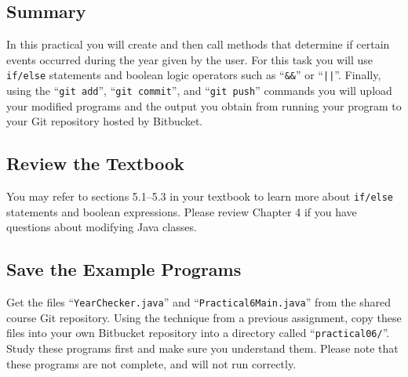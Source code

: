 




\subsection*{Summary}
\vspace*{-.05in}

In this practical you will create and then call methods that determine if certain events occurred during the year given
by the user. For this task you will use {\tt if/else} statements and boolean logic operators such as ``{\tt \&\&}'' or
``{\tt ||}''.  Finally, using the ``{\tt git add}'', ``{\tt git  commit}'', and ``{\tt git push}'' commands you will
upload your modified programs and the output you obtain from running your program to your Git repository hosted by
Bitbucket.  

\vspace*{-.1in}
\subsection*{Review the Textbook}
\vspace*{-.05in}

You may refer to sections 5.1--5.3 in your textbook to learn more about {\tt if/else} statements and boolean
expressions.  Please review Chapter 4 if you have questions about modifying Java classes.

\vspace*{-.1in}
\subsection*{Save the Example Programs}
\vspace*{-.05in}

Get the files ``{\tt YearChecker.java}'' and ``{\tt Practical6Main.java}'' from the shared course Git repository. Using
the technique from a previous assignment, copy these files into your own Bitbucket repository into a directory called
``{\tt practical06/}''. Study these programs first and make sure you understand them. Please note that these programs
are not complete, and will not run correctly.

